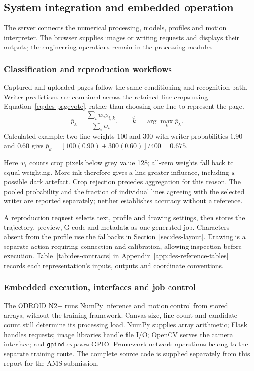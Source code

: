 \subsection{System integration and embedded operation}
\label{sec:des-integration}
The server connects the numerical processing, models, profiles and motion interpreter. The browser supplies images or writing requests and displays their outputs; the engineering operations remain in the processing modules.

\subsubsection{Classification and reproduction workflows}
Captured and uploaded pages follow the same conditioning and recognition path. Writer predictions are combined across the retained line crops using Equation~\ref{eq:des-pagevote}, rather than choosing one line to represent the page.
\begin{equation}
\overline p_k=\frac{\sum_i w_i p_{i,k}}{\sum_i w_i},\qquad
\widehat k=\arg\max_k\overline p_k.
\label{eq:des-pagevote}
\end{equation}
Calculated example: two line weights 100 and 300 with writer probabilities 0.90 and 0.60 give $\overline p_k=[100(0.90)+300(0.60)]/400=0.675$.

Here $w_i$ counts crop pixels below grey value 128; all-zero weights fall back to equal weighting. More ink therefore gives a line greater influence, including a possible dark artefact. Crop rejection precedes aggregation for this reason. The pooled probability and the fraction of individual lines agreeing with the selected writer are reported separately; neither establishes accuracy without a reference.

A reproduction request selects text, profile and drawing settings, then stores the trajectory, preview, G-code and metadata as one generated job. Characters absent from the profile use the fallbacks in Section~\ref{sec:des-layout}. Drawing is a separate action requiring connection and calibration, allowing inspection before execution. Table~\ref{tab:des-contracts} in Appendix~\ref{app:des-reference-tables} records each representation's inputs, outputs and coordinate conventions.

\subsubsection{Embedded execution, interfaces and job control}
The ODROID N2+ runs NumPy inference and motion control from stored arrays, without the training framework. Canvas size, line count and candidate count still determine its processing load. NumPy supplies array arithmetic; Flask handles requests; image libraries handle file I/O; OpenCV serves the camera interface; and \texttt{gpiod} exposes GPIO. Framework network operations belong to the separate training route. The complete source code is supplied separately from this report for the AMS submission.

